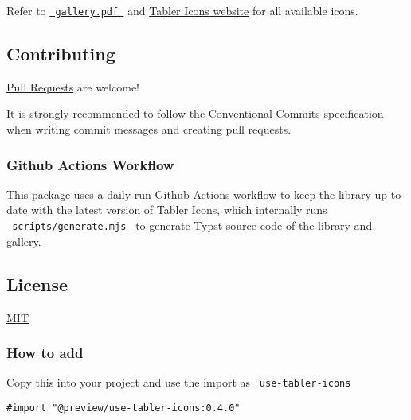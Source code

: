 Refer to
\href{https://github.com/zyf722/typst-tabler-icons/tree/main/gallery/gallery.pdf}{\texttt{\ gallery.pdf\ }}
and \href{https://tabler.io/icons}{Tabler Icons website} for all
available icons.

\subsection{Contributing}\label{contributing}

\href{https://github.com/zyf722/typst-tabler-icons/pulls}{Pull Requests}
are welcome!

It is strongly recommended to follow the
\href{https://www.conventionalcommits.org/en/v1.0.0/}{Conventional
Commits} specification when writing commit messages and creating pull
requests.

\subsubsection{Github Actions Workflow}\label{github-actions-workflow}

This package uses a daily run
\href{https://github.com/zyf722/typst-tabler-icons/tree/main/.github/workflows/build.yml}{Github
Actions workflow} to keep the library up-to-date with the latest version
of Tabler Icons, which internally runs
\href{https://github.com/zyf722/typst-tabler-icons/tree/main/scripts/generate.mjs}{\texttt{\ scripts/generate.mjs\ }}
to generate Typst source code of the library and gallery.

\subsection{License}\label{license}

\href{https://github.com/zyf722/typst-tabler-icons/tree/main/LICENSE}{MIT}

\subsubsection{How to add}\label{how-to-add}

Copy this into your project and use the import as
\texttt{\ use-tabler-icons\ }

\begin{verbatim}
#import "@preview/use-tabler-icons:0.4.0"
\end{verbatim}



